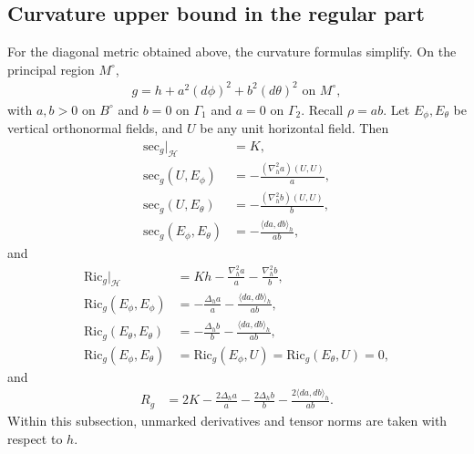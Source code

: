 \documentclass[letterpaper]{amsart}
\theoremstyle{definition}
\theoremstyle{remark}
\begin{document}
\subsection{Curvature upper bound in the regular part}
For the diagonal metric obtained above, the curvature formulas simplify. On the principal region $M^\circ$,
\begin{align*}
	g = h + a ^2 (d \phi )^2 + b ^2 (d \theta )^2 \text{ on } M ^{\circ},
\end{align*}
with $a, b >0$ on $B ^{\circ}$ and $b = 0 $ on  $\Gamma _1$ and $a = 0$ on $\Gamma _2$.
Recall $\rho = a b$.
Let $E_{\phi }, E_{\theta }$ be vertical orthonormal fields, and $U$ be any unit horizontal field. Then
\begin{align*}
	\mathrm{sec}_g|_{\mathcal{H}} &= K,\\
	\mathrm{sec}_g(U, E_{\phi }) &= - \frac{(\nabla ^2_h a) (U, U)}{a},\\
	\mathrm{sec}_g(U, E_{\theta }) &= - \frac{(\nabla ^2_h b)(U, U)}{b},\\
	\mathrm{sec}_g(E_{\phi }, E_{\theta }) &= - \frac{\langle d a, d b \rangle_{h}}{ab},
\end{align*} 
and
\begin{align*}
	\mathrm{Ric}_g|_{\mathcal{H}} &= K h - \frac{\nabla ^2_h a}{a} - \frac{\nabla ^2_h b}{b}, \\
	\mathrm{Ric}_g(E_{\phi }, E_{\phi }) &= - \frac{\Delta _h a}{a} - \frac{\langle d a , d b \rangle_h}{a b},\\
\mathrm{Ric}_g(E_{\theta }, E_{\theta }) &= - \frac{\Delta _h b}{b} - \frac{\langle d a , d b \rangle_h}{a b},\\
\mathrm{Ric}_g(E_{\phi }, E_{\theta }) &=\mathrm{Ric}_g(E_{\phi }, U) = \mathrm{Ric}_{g}(E_{\theta }, U)=0,
\end{align*} 
and
\begin{align*}
	R_g &= 2K - \frac{2 \Delta _h a}{a} - \frac{2 \Delta _h b}{b} - \frac{2 \langle d a, d b \rangle_h}{ab}.
\end{align*} 
Within this subsection, unmarked derivatives and tensor norms are taken with respect to $h$.
\end{document}
